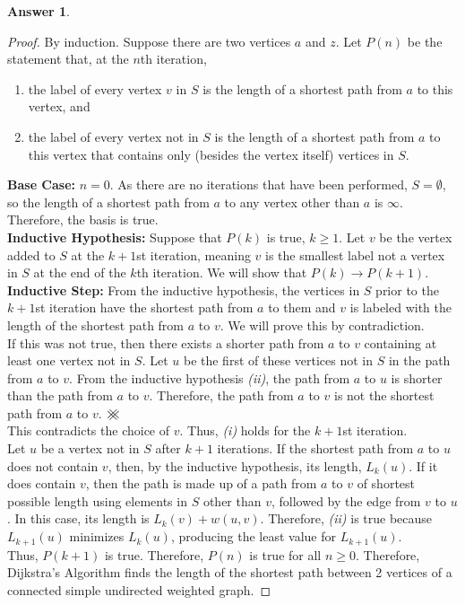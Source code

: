 \documentclass[article, 12pt]{article}
\theoremstyle{definition}
\newtheorem{answer}{Answer}
\newcommand\contradiction{\mathbin{\mathpalette\xhash\relax}}
\newcommand{\xhash}[2]{\ooalign{%
  $#1\xxhash{#1}{-45}$\cr
  $#1\xxhash{#1}{45}$\cr
  }%
}
\newcommand{\xxhash}[2]{\rotatebox[origin=c]{#2}{$#1\parallel$}}
\begin{document}
    \begin{answer}
        \begin{proof}
            By induction. Suppose there are two vertices $a$ and $z$. Let $P(n)$ be the statement that, at the $n$th iteration,
            \begin{enumerate}[\em i)]
                \item the label of every vertex $v$ in $S$ is the length of a shortest path from $a$ to this vertex, and
                \item the label of every vertex not in $S$ is the length of a shortest path from $a$ to this vertex that contains only (besides the vertex itself) vertices in $S$.
            \end{enumerate}
            \textbf{Base Case:} $n=0$. As there are no iterations that have been performed, $S = \emptyset$, so the length of a shortest path from $a$ to any vertex other than $a$ is $\infty$. Therefore, the basis is true.
            \\[12pt]
            \textbf{Inductive Hypothesis:} Suppose that $P(k)$ is true, $k \geq 1$. Let $v$ be the vertex added to $S$ at the $k+1$st iteration, meaning $v$ is the smallest label not a vertex in $S$ at the end of the $k$th iteration. We will show that $P(k) \to P(k+1)$.
            \\[12pt]
            \textbf{Inductive Step:} From the inductive hypothesis, the vertices in $S$ prior to the $k+1$st iteration have the shortest path from $a$ to them and $v$ is labeled with the length of the shortest path from $a$ to $v$. We will prove this by contradiction. 
            \\[12pt]
            If this was not true, then there exists a shorter path from $a$ to $v$ containing at least one vertex not in $S$. Let $u$ be the first of these vertices not in $S$ in the path from $a$ to $v$. From the inductive hypothesis \textit{(ii)}, the path from $a$ to $u$ is shorter than the path from $a$ to $v$. Therefore, the path from $a$ to $v$ is not the shortest path from $a$ to $v$. $\contradiction$
            \\[12pt]
            This contradicts the choice of $v$. Thus, \textit{(i)} holds for the $k+1$st iteration.
            \\[12pt]
            Let $u$ be a vertex not in $S$ after $k+1$ iterations. If the shortest path from $a$ to $u$ does not contain $v$, then, by the inductive hypothesis, its length, $L_k(u)$. If it does contain $v$, then the path is made up of a path from $a$ to $v$ of shortest possible length using elements in $S$ other than $v$, followed by the edge from $v$ to $u$. In this case, its length is $L_k(v) + w(u,v)$. Therefore, \textit{(ii)} is true because $L_{k+1}(u)$ minimizes $L_k(u)$, producing the least value for $L_{k+1}(u)$.
            \\[12pt]
            Thus, $P(k+1)$ is true. Therefore, $P(n)$ is true for all $n \geq 0$. Therefore, Dijkstra's Algorithm finds the length of the shortest path between 2 vertices of a connected simple undirected weighted graph.
        \end{proof}
    \end{answer}
\end{document}
